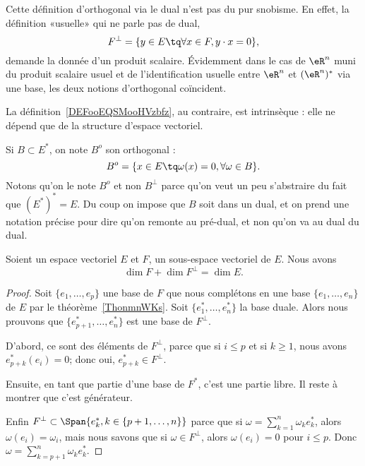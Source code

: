 Cette définition d'orthogonal via le dual n'est pas du pur snobisme. En effet, la définition «usuelle» qui ne parle pas de dual,
\begin{equation}
	F^{\perp}=\{ y\in E\tq \forall x\in F,y\cdot x=0 \},
\end{equation}
demande la donnée d'un produit scalaire. Évidemment dans le cas de \( \eR^n\) muni du produit scalaire usuel et de l'identification usuelle entre \( \eR^n\) et \( (\eR^n)^*\) via une base, les deux notions d'orthogonal coïncident.

La définition~\ref{DEFooEQSMooHVzbfz}, au contraire, est intrinsèque : elle ne dépend que de la structure d'espace vectoriel.

Si \( B\subset E^*\), on note \( B^o\) son orthogonal :
\begin{equation}
	B^o=\{ x\in E\tq \omega(x)=0, \forall\omega\in B \}.
\end{equation}
Notons qu'on le note \( B^o\) et non \( B^{\perp}\) parce qu'on veut un peu s'abstraire du fait que \( (E^*)^*=E\). Du coup on impose que \( B\) soit dans un dual, et on prend une notation précise pour dire qu'on remonte au pré-dual, et non qu'on va au dual du dual.

\begin{proposition} \label{PropXrTDIi}
	Soient un espace vectoriel \( E\) et \( F\), un sous-espace vectoriel de \( E\). Nous avons
	\begin{equation}
		\dim F+\dim F^{\perp}=\dim E.
	\end{equation}
\end{proposition}

\begin{proof}
	Soit \( \{ e_1,\ldots, e_p \}\) une base de \( F\) que nous complétons en une base \( \{ e_1,\ldots, e_n \}\) de \( E\) par le théorème~\ref{ThonmnWKs}. Soit \( \{ e_1^*,\ldots, e^*_n \}\) la base duale. Alors nous prouvons que \( \{ e^*_{p+1},\ldots, e_n^* \}\) est une base de \( F^{\perp}\).

	D'abord, ce sont des éléments de \( F^{\perp}\), parce que si \( i\leq p\) et si \( k\geq 1\), nous avons \( e^*_{p+k}(e_i)=0\); donc oui, \( e^*_{p+k}\in F^{\perp}\).

	Ensuite, en tant que partie d'une base de \( F^*\), c'est une partie libre. Il reste à montrer que c'est générateur.


	Enfin \( F^{\perp}\subset\Span\{ e_{k}^*, k \in \{p+1, \dots, n\}\}\) parce que si \( \omega=\sum_{k=1}^n\omega_ke_k^*\), alors \( \omega(e_i)=\omega_i\), mais nous savons que si \( \omega\in F^{\perp}\), alors \( \omega(e_i)=0\) pour \( i\leq p\). Donc \( \omega=\sum_{k=p+1}^n\omega_ke^*_k\).
\end{proof}


